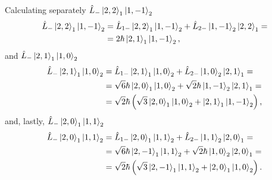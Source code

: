 Calculating separately $\hat{L}_{-} \Ket{2,2}_1 \Ket{1,-1}_2$  
\begin{align}
    \notag
    \hat{L}_{-} \Ket{2,2}_1 \Ket{1,-1}_2 &=
    \hat{L}_{1-} \Ket{2,2}_1 \Ket{1,-1}_2 
    + 
    \hat{L}_{2-} \Ket{1,-1}_2 \Ket{2,2}_1 = \\
                           &=
    2 \hbar \Ket{2,1}_1 \Ket{1,-1}_2,
\end{align}
and $\hat{L}_{-} \Ket{2,1}_1 \Ket{1,0}_2$
\begin{align}
    \notag
    \hat{L}_{-} \Ket{2,1}_1 \Ket{1,0}_2 &=
    \hat{L}_{1-} \Ket{2,1}_1 \Ket{1,0}_2 
    + 
    \hat{L}_{2-} \Ket{1,0}_2 \Ket{2,1}_1 = \\
    \notag
                           &=
    \sqrt{6} \hbar \Ket{2,0}_1 \Ket{1,0}_2
    +
    \sqrt{2} \hbar \Ket{1,-1}_2 \Ket{2,1}_1 = \\
                           &=
    \sqrt{2} \hbar \left( 
        \sqrt{3} \Ket{2,0}_1 \Ket{1,0}_2
        +
        \Ket{2,1}_1 \Ket{1,-1}_2 
    \right),
\end{align}
and, lastly, $\hat{L}_{-} \Ket{2,0}_1 \Ket{1,1}_2$
\begin{align}
    \notag
    \hat{L}_{-} \Ket{2,0}_1 \Ket{1,1}_2 &=
    \hat{L}_{1-} \Ket{2,0}_1 \Ket{1,1}_2 
    + 
    \hat{L}_{2-} \Ket{1,1}_2 \Ket{2,0}_1 = \\
    \notag
                           &=
    \sqrt{6} \hbar \Ket{2,-1}_1 \Ket{1,1}_2
    +
    \sqrt{2} \hbar \Ket{1,0}_2 \Ket{2,0}_1 = \\
                           &=
    \sqrt{2} \hbar \left( 
        \sqrt{3} \Ket{2,-1}_1 \Ket{1,1}_2
        +
        \Ket{2,0}_1 \Ket{1,0}_2
    \right).
\end{align}

